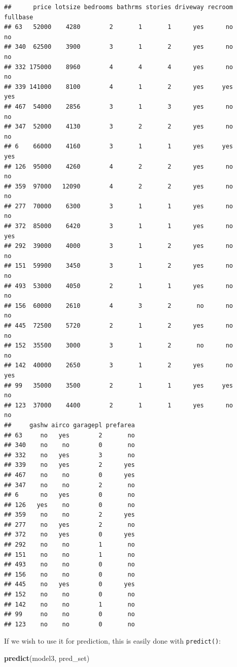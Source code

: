 \documentclass[]{gitbook}
\newenvironment{Shaded}{\begin{snugshade}}{\end{snugshade}}
\newcommand{\KeywordTok}[1]{\textcolor[rgb]{0.13,0.29,0.53}{\textbf{#1}}}
\newcommand{\NormalTok}[1]{#1}
\theoremstyle{definition}
\theoremstyle{definition}
\theoremstyle{definition}
\theoremstyle{remark}
\begin{document}
\begin{verbatim}
##      price lotsize bedrooms bathrms stories driveway recroom fullbase
## 63   52000    4280        2       1       1      yes      no       no
## 340  62500    3900        3       1       2      yes      no       no
## 332 175000    8960        4       4       4      yes      no       no
## 339 141000    8100        4       1       2      yes     yes      yes
## 467  54000    2856        3       1       3      yes      no       no
## 347  52000    4130        3       2       2      yes      no       no
## 6    66000    4160        3       1       1      yes     yes      yes
## 126  95000    4260        4       2       2      yes      no       no
## 359  97000   12090        4       2       2      yes      no       no
## 277  70000    6300        3       1       1      yes      no       no
## 372  85000    6420        3       1       1      yes      no      yes
## 292  39000    4000        3       1       2      yes      no       no
## 151  59900    3450        3       1       2      yes      no       no
## 493  53000    4050        2       1       1      yes      no       no
## 156  60000    2610        4       3       2       no      no       no
## 445  72500    5720        2       1       2      yes      no       no
## 152  35500    3000        3       1       2       no      no       no
## 142  40000    2650        3       1       2      yes      no      yes
## 99   35000    3500        2       1       1      yes     yes       no
## 123  37000    4400        2       1       1      yes      no       no
##     gashw airco garagepl prefarea
## 63     no   yes        2       no
## 340    no    no        0       no
## 332    no   yes        3       no
## 339    no   yes        2      yes
## 467    no    no        0      yes
## 347    no    no        2       no
## 6      no   yes        0       no
## 126   yes    no        0       no
## 359    no    no        2      yes
## 277    no   yes        2       no
## 372    no   yes        0      yes
## 292    no    no        1       no
## 151    no    no        1       no
## 493    no    no        0       no
## 156    no    no        0       no
## 445    no   yes        0      yes
## 152    no    no        0       no
## 142    no    no        1       no
## 99     no    no        0       no
## 123    no    no        0       no
\end{verbatim}

If we wish to use it for prediction, this is easily done with
\texttt{predict()}:

\begin{Shaded}
\begin{Highlighting}[]
\KeywordTok{predict}\NormalTok{(model3, pred_set)}
\end{Highlighting}
\end{Shaded}
\end{document}
